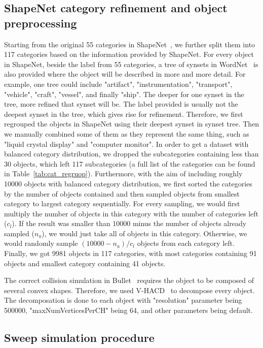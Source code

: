 \subsection{ShapeNet category refinement and object preprocessing}

Starting from the original 55 categories in ShapeNet~\cite{Chang2015}, we further split them into 117 categories based on the information provided by ShapeNet.
For every object in ShapeNet, beside the label from 55 categories, a tree of synsets in WordNet~\cite{miller1995wordnet} is also provided where the object will be described in more and more detail. 
For example, one tree could include "artifact", "instrumentation", "transport", "vehicle", "craft", "vessel", and finally "ship". 
The deeper for one synset in the tree, more refined that synset will be. 
The label provided is usually not the deepest synset in the tree, which gives rise for refinement. 
Therefore, we first regrouped the objects in ShapeNet using their deepest synset in synset tree.
Then we manually combined some of them as they represent the same thing, such as "liquid crystal display" and "computer monitor".
In order to get a dataset with balanced category distribution, we dropped the subcategories containing less than 30 objects, which left 117 subcategories (a full list of the categories can be found in Table~\ref{tab:cat_regruop}).
Furthermore, with the aim of including roughly 10000 objects with balanced category distribution, we first sorted the categories by the number of objects contained and then sampled objects from smallest category to largest category sequentially. 
For every sampling, we would first multiply the number of objects in this category with the number of categories left ($c_l$). 
If the result was smaller than 10000 minus the number of objects already sampled ($n_a$), we would just take all of objects in this category.
Otherwise, we would randomly sample $(10000 - n_a)/c_l$ objects from each category left.
Finally, we got 9981 objects in 117 categories, with most categories containing 91 objects and smallest category containing 41 objects.

The correct collision simulation in Bullet~\cite{wiki:bullet} requires the object to be composed of several convex shapes.
Therefore, we used V-HACD~\cite{mamou2009simple} to decompose every object.
The decomposation is done to each object with "resolution" parameter being 500000, "maxNumVerticesPerCH" being 64, and other parameters being default.

\subsection{Sweep simulation procedure}

